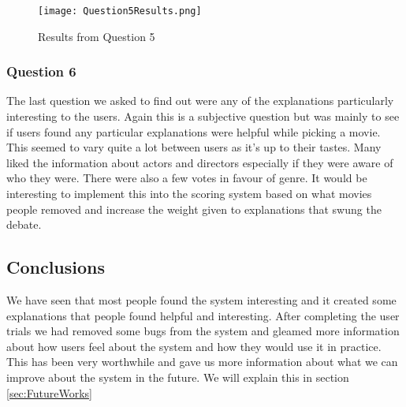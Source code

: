                 \begin{figure}
                    \centering
                    \texttt{[image: Question5Results.png]}
                    \caption{Results from Question 5}
                    \label{fig:Question5Results}
                \end{figure}


            \subsubsection{Question 6}
                The last question we asked to find out were any of the explanations particularly interesting to the users. Again this is a subjective question but was mainly to see if users found any particular explanations were helpful while picking a movie. This seemed to vary quite a lot between users as it's up to their tastes. Many liked the information about actors and directors especially if they were aware of who they were. There were also a few votes in favour of genre.
                It would be interesting to implement this into the scoring system based on what movies people removed and increase the weight given to explanations that swung the debate.
        


        \subsection{Conclusions}
            We have seen that most people found the system interesting and it created some explanations that people found helpful and interesting. After completing the user trials we had removed some bugs from the system and gleamed more information about how users feel about the system and how they would use it in practice. This has been very worthwhile and gave us more information about what we can improve about the system in the future. We will explain this in section \ref{sec:FutureWorks}